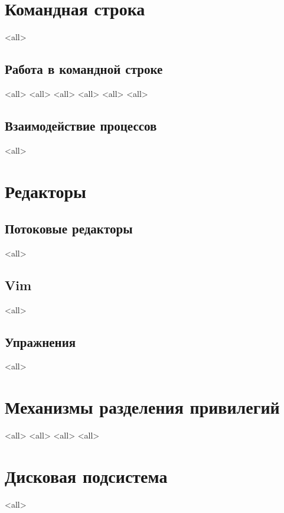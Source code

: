 \chapter{Командная строка}
\mode<all>{}
\section{Работа в командной строке}
\mode<all>{}
\mode<all>{}
\mode<all>{}
\mode<all>{}
\mode<all>{}
\mode<all>{}


\section{Взаимодействие процессов}
\mode<all>{}

\chapter{Редакторы}
\section{Потоковые редакторы}
\mode<all>{}
\section{Vim}
\mode<all>{}

\section*{Упражнения}
\mode<all>{}

\chapter{Механизмы разделения привилегий}

\mode<all>{}
\mode<all>{}
\mode<all>{}
\mode<all>{}

\chapter{Дисковая подсистема}
\mode<all>{}
